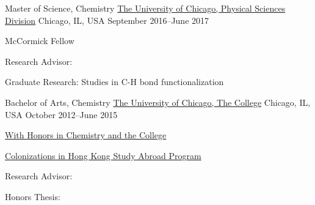 

\begin{cventries}

  \cventry
    {Master of Science, Chemistry} %
    {\href{https://chemistry.uchicago.edu/graduate-program}{The University of Chicago, Physical Sciences Division}} %
    {Chicago, IL, USA} %
    {September 2016--June 2017} %
    {
      \begin{cvitems} %
        \item {McCormick Fellow}
        \item {Research Advisor: }
        \item {Graduate Research: Studies in C-H bond functionalization}
      \end{cvitems}
    }

  \cventry
    {Bachelor of Arts, Chemistry} %
    {\href{http://college.uchicago.edu/}{The University of Chicago, The College}} %
    {Chicago, IL, USA} %
    {October 2012--June 2015} %
    {
    	\begin{cvitems} %
    		\item {\href{http://collegecatalog.uchicago.edu/thecollege/chemistry/#undergraduateresearchandhonors}{With Honors in Chemistry and the College}}
    		\item {\href{https://www.uchicago.hk/students/study-abroad/}{Colonizations in Hong Kong Study Abroad Program}}
    		\item {Research Advisor: }
    		\item {Honors Thesis: }
    	\end{cvitems}
	}

\end{cventries}
